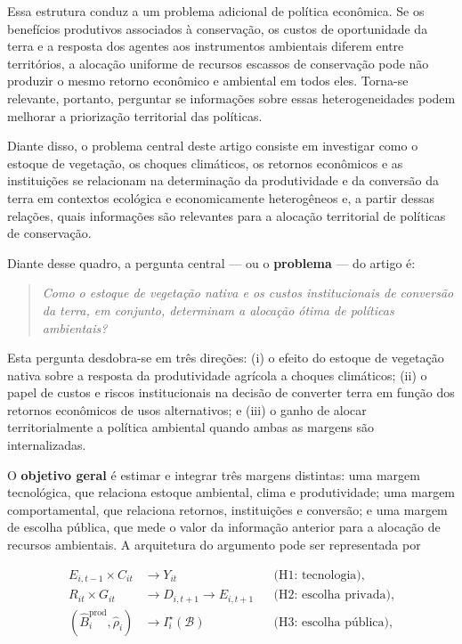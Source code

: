 Essa estrutura conduz a um problema adicional de política econômica. Se os benefícios produtivos associados à conservação, os custos de oportunidade da terra e a resposta dos agentes aos instrumentos ambientais diferem entre territórios, a alocação uniforme de recursos escassos de conservação pode não produzir o mesmo retorno econômico e ambiental em todos eles. Torna-se relevante, portanto, perguntar se informações sobre essas heterogeneidades podem melhorar a priorização territorial das políticas.

Diante disso, o problema central deste artigo consiste em investigar como o estoque de vegetação, os choques climáticos, os retornos econômicos e as instituições se relacionam na determinação da produtividade e da conversão da terra em contextos ecológica e economicamente heterogêneos e, a partir dessas relações, quais informações são relevantes para a alocação territorial de políticas de conservação.


Diante desse quadro, a pergunta central --- ou o \textbf{problema} --- do artigo é:

\begin{quote}
\emph{Como o estoque de vegetação nativa e os custos institucionais de conversão da terra, em conjunto, determinam a alocação ótima de políticas ambientais?}
\end{quote}

Esta pergunta desdobra-se em três direções: (i) o efeito do estoque de vegetação nativa sobre a resposta da produtividade agrícola a choques climáticos; (ii) o papel de custos e riscos institucionais na decisão de converter terra em função dos retornos econômicos de usos alternativos; e (iii) o ganho de alocar territorialmente a política ambiental quando ambas as margens são internalizadas.

O \textbf{objetivo geral} é estimar e integrar três margens distintas: uma margem tecnológica, que relaciona estoque ambiental, clima e produtividade; uma margem comportamental, que relaciona retornos, instituições e conversão; e uma margem de escolha pública, que mede o valor da informação anterior para a alocação de recursos ambientais. A arquitetura do argumento pode ser representada por

\begin{equation}
\begin{aligned}
    E_{i,t-1}\times C_{it} &\longrightarrow Y_{it}
        && \text{(H1: tecnologia)}, \\
    R_{it}\times G_{it} &\longrightarrow D_{i,t+1}
        \longrightarrow E_{i,t+1}
        && \text{(H2: escolha privada)}, \\
    \left(\widehat{B}^{\mathrm{prod}}_i,
    \widehat{\rho}_i\right) &\longrightarrow I_i^{\star}(\mathcal{B})
        && \text{(H3: escolha pública)},
\end{aligned}
\label{eq:architecture}
\end{equation}

